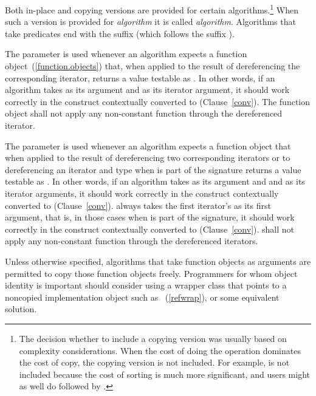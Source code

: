 \pnum
Both in-place and copying versions are provided for certain
algorithms.\footnote{The decision whether to include a copying version was
usually based on complexity considerations. When the cost of doing the operation
dominates the cost of copy, the copying version is not included. For example,
 is not included because the cost of sorting is much more
significant, and users might as well do  followed by .}
When such a version is provided for \textit{algorithm} it is called
\textit{algorithm}. Algorithms that take predicates end with the
suffix  (which follows the suffix ).

\pnum
The
parameter is used whenever an algorithm expects a function object~(\ref{function.objects})
that, when applied to the result
of dereferencing the corresponding iterator, returns a value testable as
.
In other words, if an algorithm
takes
as its argument and 
as its iterator argument, it should work correctly in the
construct
 contextually converted to  (Clause~\ref{conv}).
The function object
shall not apply any non-constant
function through the dereferenced iterator.

\pnum
The
parameter is used whenever an algorithm expects a function object that when applied to
the result of dereferencing two corresponding iterators or to dereferencing an
iterator and type
when
is part of the signature returns a value testable as
.
In other words, if an algorithm takes
as its argument and  and  as
its iterator arguments, it should work correctly in
the construct
 contextually converted to  (Clause~\ref{conv}).
always takes the first
iterator's 
as its first argument, that is, in those cases when
is part of the signature, it should work
correctly in the
construct  contextually converted to  (Clause~\ref{conv}).
 shall not
apply any non-constant function through the dereferenced iterators.

\pnum
\enternote
Unless otherwise specified, algorithms that take function objects as arguments
are permitted to copy those function objects freely. Programmers for whom object
identity is important should consider using a wrapper class that points to a
noncopied implementation object such as ~(\ref{refwrap}), or some equivalent solution.
\exitnote

